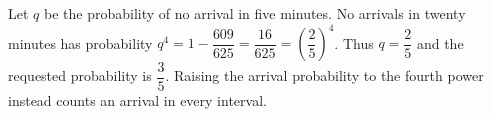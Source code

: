 Let $q$ be the probability of no arrival in five minutes. No arrivals in twenty minutes has probability $q^4=1-\dfrac{609}{625}=\dfrac{16}{625}=(\dfrac{2}{5})^4$. Thus $q=\dfrac{2}{5}$ and the requested probability is $\boxed{\dfrac{3}{5}}$. Raising the arrival probability to the fourth power instead counts an arrival in every interval.
